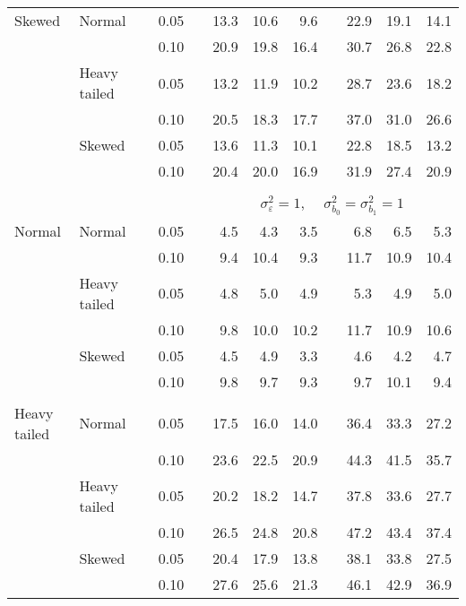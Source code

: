 \begin{table}[ht]
\begin{scriptsize}
\begin{center}
\begin{tabular}{ll p{.1cm} c p{.1cm} rrr p{.1cm} rrr}
Skewed       & Normal       && 0.05 &&   13.3 & 10.6 & 9.6 &   & 22.9 & 19.1 & 14.1 \\ 
             &              && 0.10 &&   20.9 & 19.8 & 16.4 &   & 30.7 & 26.8 & 22.8 \\ 
             & Heavy tailed && 0.05 &&   13.2 & 11.9 & 10.2 &   & 28.7 & 23.6 & 18.2 \\ 
             &              && 0.10 &&   20.5 & 18.3 & 17.7 &   & 37.0 & 31.0 & 26.6 \\ 
             & Skewed       && 0.05 &&   13.6 & 11.3 & 10.1 &   & 22.8 & 18.5 & 13.2 \\ 
             &              && 0.10 &&   20.4 & 20.0 & 16.9 &   & 31.9 & 27.4 & 20.9 \\ 

&&&&&&&&&&&\\
& && && \multicolumn{7}{c}{$\sigma_{\varepsilon}^2 = 1$, \ \ $\sigma_{b_0}^2 = \sigma_{b_1}^2 = 1$} \\ \cline{6-12}
\rowcolor{gray!20}Normal       & Normal       && 0.05 &&   4.5 & 4.3 & 3.5 &   & 6.8 & 6.5 & 5.3 \\ 
\rowcolor{gray!20}             &              && 0.10 &&   9.4 & 10.4 & 9.3 &   & 11.7 & 10.9 & 10.4 \\ 
\rowcolor{gray!20}             & Heavy tailed && 0.05 &&   4.8 & 5.0 & 4.9 &   & 5.3 & 4.9 & 5.0 \\ 
\rowcolor{gray!20}             &              && 0.10 &&   9.8 & 10.0 & 10.2 &   & 11.7 & 10.9 & 10.6 \\ 
\rowcolor{gray!20}             & Skewed       && 0.05 &&   4.5 & 4.9 & 3.3 &   & 4.6 & 4.2 & 4.7 \\ 
\rowcolor{gray!20}             &              && 0.10 &&   9.8 & 9.7 & 9.3 &   & 9.7 & 10.1 & 9.4 \\ 
&&&&&&&&&&&\\
Heavy tailed & Normal       && 0.05 &&   17.5 & 16.0 & 14.0 &   & 36.4 & 33.3 & 27.2 \\ 
             &              && 0.10 &&   23.6 & 22.5 & 20.9 &   & 44.3 & 41.5 & 35.7 \\ 
             & Heavy tailed && 0.05 &&   20.2 & 18.2 & 14.7 &   & 37.8 & 33.6 & 27.7 \\ 
             &              && 0.10 &&   26.5 & 24.8 & 20.8 &   & 47.2 & 43.4 & 37.4 \\ 
             & Skewed       && 0.05 &&   20.4 & 17.9 & 13.8 &   & 38.1 & 33.8 & 27.5 \\ 
             &              && 0.10 &&   27.6 & 25.6 & 21.3 &   & 46.1 & 42.9 & 36.9 \\ 

\end{tabular}
\end{center}
\end{scriptsize}
\end{table}
